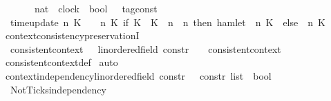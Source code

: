 \begin{isabellebody}
\ \ \ \ \ \ {\isasymRightarrow}\ {\isacharparenleft}nat\ {\isasymRightarrow}\ clock\ {\isasymRightarrow}\ {\isacharparenleft}bool\ {\isasymtimes}\ {\isacharprime}{\isasymtau}\ tag{\isacharunderscore}const{\isacharparenright}{\isacharparenright}{\isacartoucheclose}\isanewline
{}\isanewline
\ \ {\isacartoucheopen}time{\isacharunderscore}update\ n\ K\ {\isasymtau}\ {\isasymrho}\ {\isacharequal}\ {\isacharparenleft}{\isasymlambda}n{\isacharprime}\ K{\isacharprime}{\isachardot}\ if\ K\ {\isacharequal}\ K{\isacharprime}\ {\isasymand}\ n\ {\isasymle}\ n{\isacharprime}\ then\ {\isacharparenleft}hamlet\ {\isacharparenleft}{\isasymrho}\ n\ K{\isacharparenright}{\isacharcomma}\ {\isasymtau}{\isacharparenright}\ else\ {\isasymrho}\ n{\isacharprime}\ K{\isacharprime}{\isacharparenright}{\isacartoucheclose}%
\isadelimdocument
%
\endisadelimdocument
%
\isatagdocument
%
\isamarkuptrue%
%
\endisatagdocument
{\isafolddocument}%
%
\isadelimdocument
%
\endisadelimdocument
{}\isamarkupfalse%
\ context{\isacharunderscore}consistency{\isacharunderscore}preservationI{\isacharcolon}\isanewline
\ \ {\isacartoucheopen}consistent{\isacharunderscore}context\ {\isacharparenleft}{\isacharparenleft}{\isasymgamma}\ {\isacharcolon}{\isacharcolon}\ {\isacharparenleft}{\isacharprime}{\isasymtau}{\isacharcolon}{\isacharcolon}linordered{\isacharunderscore}field{\isacharparenright}\ constr{\isacharparenright}\ {\isacharhash}\ {\isasymGamma}{\isacharparenright}\ {\isasymLongrightarrow}\ consistent{\isacharunderscore}context\ {\isasymGamma}{\isacartoucheclose}\isanewline
%
\isadelimproof
%
\endisadelimproof
%
\isatagproof
{}\isamarkupfalse%
\ consistent{\isacharunderscore}context{\isacharunderscore}def\isanewline
{}\isamarkupfalse%
\ auto\isanewline
\isanewline
%
%
\endisatagproof
{\isafoldproof}%
%
\isadelimproof
\isanewline
%
\endisadelimproof
{}\isamarkupfalse%
\ context{\isacharunderscore}independency{\isacharcolon}{\isacharcolon}{\isacartoucheopen}{\isacharparenleft}{\isacharprime}{\isasymtau}{\isacharcolon}{\isacharcolon}linordered{\isacharunderscore}field{\isacharparenright}\ constr\ {\isasymRightarrow}\ {\isacharprime}{\isasymtau}\ constr\ list\ {\isasymRightarrow}\ bool{\isacartoucheclose}\ {\isacharparenleft}{\isachardoublequoteopen}{\isacharunderscore}\ {\isasymbowtie}\ {\isacharunderscore}{\isachardoublequoteclose}{\isacharparenright}\isanewline
{}\isanewline
\ \ NotTicks{\isacharunderscore}independency{\isacharcolon}\isanewline

\end{isabellebody}
